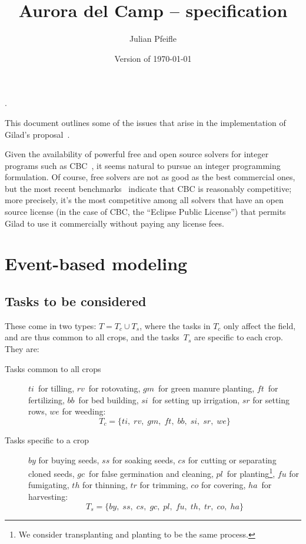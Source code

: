 \documentclass[11pt]{amsart}
\numberwithin{equation}{section}
\begin{document}
\renewcommand*\descriptionlabel[1]{%
\hspace\labelsep\normalfont\itshape #1:}.

\title{Aurora del Camp -- specification}
\author{Julian Pfeifle}
\date{Version of \today}
\maketitle

This document outlines some of the issues that arise in the
implementation of Gilad's proposal~\cite{buzi11}.

\medskip
Given the availability of powerful free and open source solvers for
integer programs such as CBC~\cite{cbc}, it seems natural to pursue an
integer programming formulation. Of course, free solvers are not as
good as the best commercial ones, but the most recent
benchmarks~\cite{mittelmann11} indicate that CBC is reasonably
competitive; more precisely, it's the most competitive among all
solvers that have an open source license (in the case of CBC, the
``Eclipse Public License'') that permits Gilad to use it commercially
without paying any license fees.

\section{Event-based modeling}


\subsection{Tasks to be considered}

These come in two types: $T=T_c\cup T_s$, where the tasks in $T_c$
only affect the field, and are thus common to all crops, and the
tasks~$T_s$ are specific to each crop. They are:

\begin{description}
\item[Tasks common to all crops]  $ti$~for tilling, $rv$~for
  rotovating, $gm$~for green manure planting, $f\!t$~for fertilizing,
  $bb$~for bed building, $si$~for setting up irrigation, $sr$ for
  setting rows, $we$ for weeding:
  \[
     T_c = \{ ti,\;rv,\;gm,\;f\!t,\;bb,\;si,\;sr,\;we\}
  \]

\smallskip
\item[Tasks specific to a crop] $by$ for buying seeds, $ss$ for
  soaking seeds, $cs$ for cutting or separating cloned seeds, $gc$~for
  false germination and cleaning, $pl$~for planting\footnote{We
    consider transplanting and planting to be the same process.},
  $f\!u$ for fumigating, $th$ for thinning, $tr$ for trimming, $co$
  for covering, $ha$~for harvesting:
  \[
     T_s = \{ by,\;ss,\;cs,\;gc,\;pl,\;f\!u,\;th,\;tr,\;co,\;ha\}
  \]

\end{description}
\end{document}
